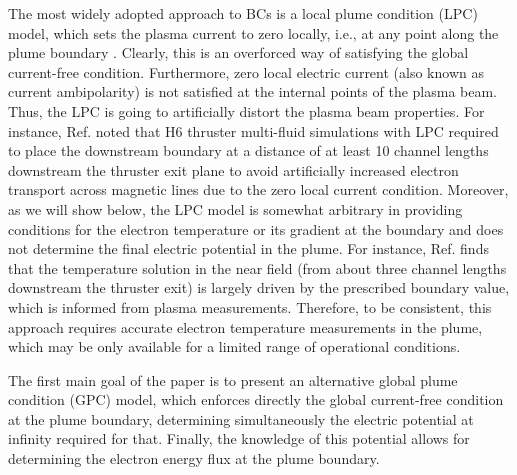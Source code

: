 \documentclass[%
 aip,
cha,
 amsmath,amssymb,
 reprint,%
]{revtex4-1}
\begin{document}
The most widely adopted approach to BCs is a local plume condition (LPC) model, which sets the plasma current to zero locally, i.e., at any point along the plume boundary \cite{mike12b,parr06a,pera22b}.
Clearly, this is an overforced way of satisfying  the global current-free condition. Furthermore, zero local electric current (also known as current ambipolarity) is not satisfied at the  internal points of the plasma beam. Thus, the LPC is going to artificially distort the plasma beam properties.
%
For instance, Ref.  noted that H6 thruster multi-fluid simulations with LPC required to place the downstream boundary at a distance of at least 10 channel lengths downstream the thruster exit plane to avoid artificially increased electron transport across magnetic lines due to the zero local current condition.
%
Moreover, as we will show below, the LPC model is somewhat arbitrary in providing conditions for the electron temperature or its gradient at the boundary and does not determine the final electric potential in the plume. For instance, Ref.  finds that the temperature solution in the near field (from about three channel lengths downstream the thruster exit) is largely driven by the prescribed boundary value, which is informed from plasma measurements.
Therefore, to be consistent, this approach requires accurate electron temperature measurements in the plume, which may be only available for a limited range of operational conditions.

The first main goal of the paper is to present an alternative global plume condition (GPC) model, which enforces directly the global current-free condition at the plume boundary, determining simultaneously the electric potential at infinity required for that. Finally, the knowledge of this potential allows for determining the electron energy flux at the plume boundary.
\end{document}
